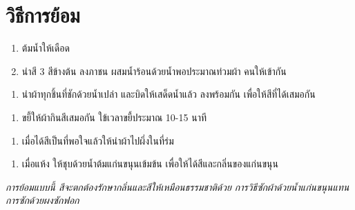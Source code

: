 

\section{วิธีการย้อม}

\begin{enumerate}
\def\labelenumi{(\arabic{enumi})}
\item
  ต้มน้ำให้เดือด
\item
  นำสี 3 สีข้างต้น ลงภาชน ผสมน้ำร้อนด้วยน้ำพอประมาณท่วมผ้า คนให้เข้ากัน
\end{enumerate}





\clearpage

\begin{enumerate}
\def\labelenumi{(\arabic{enumi})}
\setcounter{enumi}{2}
\tightlist
\item
  นำผ้าทุกชิ้นที่ชักด้วยน้ำเปล่า และบิดให้เสด็ดน้ำแล้ว ลงพร้อมกัน เพื่อให้สีที่ได้เสมอกัน
\end{enumerate}



\begin{enumerate}
\def\labelenumi{(\arabic{enumi})}
\setcounter{enumi}{3}
\tightlist
\item
  ขยี้ให้ผ้ากินสีเสมอกัน ใข้เวลาขยี้ประมาณ 10-15 นาที
\end{enumerate}



\clearpage

\begin{enumerate}
\def\labelenumi{(\arabic{enumi})}
\setcounter{enumi}{4}
\tightlist
\item
  เมื่อได้สีเป็นที่พอใจแล้วให้นำผ้าไปผึ่งในที่ร่ม
\end{enumerate}



\begin{enumerate}
\def\labelenumi{(\arabic{enumi})}
\setcounter{enumi}{5}
\tightlist
\item
  เมื่อแห้ง ให้ชุบด้วยน้ำต้มแก่นขนุนเข้มข้น เพื่อให้ได้สีและกลิ่นของแก่นขนุน
\end{enumerate}

\emph{การย้อมแบบนี้ สีจะตกต้องรักษากลิ่นและสีให้เหมือนธรรมชาติด้วย
การวิธีซักผ้าด้วยน้ำแก่นขนุนแทนการซักด้วยผงซักฟอก}

